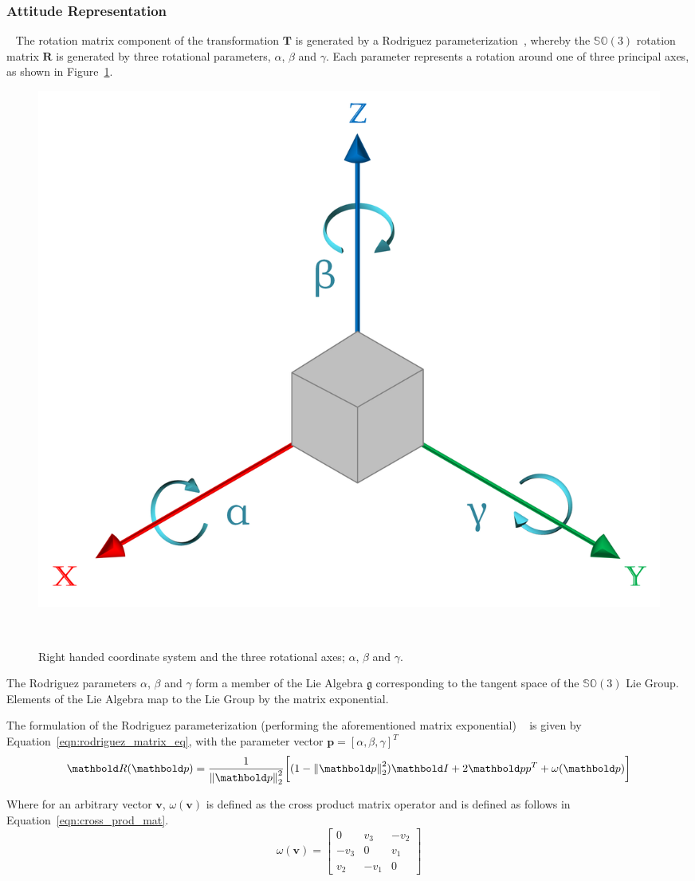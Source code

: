 \subsubsection{Attitude Representation}
~\label{subsub:moseg_static_camera_attitude}
The rotation matrix component of the transformation \(\bm{T}\) is
generated by a Rodriguez parameterization~\cite{Shuster1993}, whereby the
\(\mathbb{SO}(3)\) rotation matrix \(\bm{R}\) is generated by three rotational
parameters, \( \alpha \), \( \beta \) and \( \gamma \). Each parameter represents a 
rotation around one of three principal axes, as shown in Figure~\ref{figure:euler_axes}.
\begin{figure}[!htbp]
  \centering
  \includegraphics[width=.6\linewidth]{figures/moseg/euler_angles.png}
  \caption[Rotational Axes]{Right handed coordinate system and the three rotational axes; 
  \( \alpha \), \( \beta \) and \( \gamma \).}
~\label{figure:euler_axes}
\end{figure}

The Rodriguez parameters \( \alpha \), \( \beta \) and \( \gamma \) form a member of the Lie Algebra 
\( \mathfrak{g} \) corresponding to the tangent space of the \( \mathbb{SO}(3) \) Lie Group. Elements 
of the Lie Algebra map to the Lie Group by the matrix exponential.

The formulation of the Rodriguez parameterization (performing the aforementioned matrix exponential)
~\cite{Shuster1993} is given by Equation~\ref{eqn:rodriguez_matrix_eq}, with the parameter vector
\(\bm{p} = {[\alpha, \beta, \gamma]}^{T}\)
\begin{equation}
  \label{eqn:rodriguez_matrix_eq}
  \bm{R}(\bm{p}) =
  \frac{1}{\norm{\bm{p}}^{2}}
  \bigg[
  (1 - \norm{\bm{p}}^{2})\bm{I} +
  2 \bm{pp}^{T} + \omega(\bm{p})
  \bigg]
\end{equation}

Where for an arbitrary vector \(\bm{v}\), \(\omega(\bm{v})\) is defined as
the cross product matrix operator and is defined as follows in Equation~\ref{eqn:cross_prod_mat}.
\begin{equation}
  \label{eqn:cross_prod_mat}
  \omega(\bm{v}) =
  \begin{bmatrix}
    0 & v_{3} & -v_{2} \\
    -v_{3} & 0 & v_{1} \\
    v_{2} & -v_{1} & 0
  \end{bmatrix}
\end{equation}

